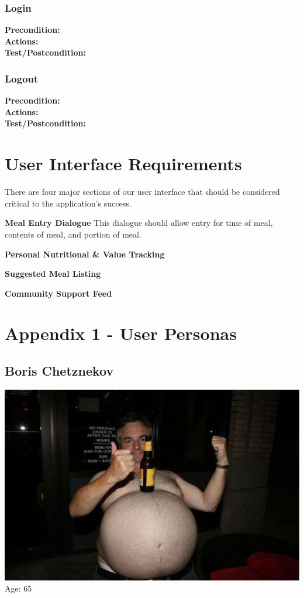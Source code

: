\documentclass[a4paper,12pt]{article}
\begin{document}
\subsubsection{Login}
\textbf{Precondition:}\\
\textbf{Actions:}\\
\textbf{Test/Postcondition:}
\subsubsection{Logout}
\textbf{Precondition:}\\
\textbf{Actions:}\\
\textbf{Test/Postcondition:}
\section*{User Interface Requirements}
There are four major sections of our user interface that should be considered critical to the application's success.
\begin{list}{•}{•}
\item \textbf{Meal Entry Dialogue}  This dialogue should allow entry for time of meal, contents of meal, and portion of meal.
\item \textbf{Personal Nutritional \& Value Tracking}
\item \textbf{Suggested Meal Listing}
\item \textbf{Community Support Feed}
\end{list}
\newpage 
\section*{Appendix 1 - User Personas}
\subsection*{Boris Chetznekov}
\includegraphics[scale=0.3]{Boris.jpg}
Age: 65\\
\end{document}
